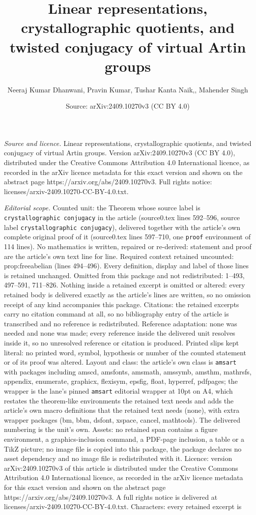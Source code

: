 \documentclass[10pt,a4paper]{amsart}
\title[Linear representations, crystallographic quotients, and twis]{Linear representations, crystallographic quotients, and twisted conjugacy of virtual Artin groups}
\author{Neeraj Kumar Dhanwani, Pravin Kumar, Tushar Kanta Naik,, Mahender Singh}
\date{Source: arXiv:2409.10270v3 (CC BY 4.0)}
\begin{document}
\maketitle

\noindent\emph{Source and licence.} Linear representations, crystallographic quotients, and twisted conjugacy of virtual Artin groups. Version arXiv:2409.10270v3 (CC BY 4.0), distributed under the Creative Commons Attribution 4.0 International licence, as recorded in the arXiv licence metadata for this exact version and shown on the abstract page https://arxiv.org/abs/2409.10270v3. Full rights notice: licenses/arxiv-2409.10270-CC-BY-4.0.txt.\par\smallskip

\noindent\textit{Editorial scope.} Counted unit: the Theorem whose source label is \texttt{crystallographic conjugacy} in the article (source0.tex lines 592--596, source label \texttt{crystallographic conjugacy}), delivered together with the article's own complete original proof of it (source0.tex lines 597--710, one \texttt{proof} environment of 114 lines). No mathematics is written, repaired or re-derived: statement and proof are the article's own text line for line. Required context retained uncounted: prop:freeabelian (lines 494--496). Every definition, display and label of those lines is retained unchanged. Omitted from this package and not redistributed: 1--493, 497--591, 711--826. Nothing inside a retained excerpt is omitted or altered: every retained body is delivered exactly as the article's lines are written, so no omission receipt of any kind accompanies this package. Citations: the retained excerpts carry no citation command at all, so no bibliography entry of the article is transcribed and no reference is redistributed. Reference adaptation: none was needed and none was made; every reference inside the delivered unit resolves inside it, so no unresolved reference or citation is produced. Printed slips kept literal: no printed word, symbol, hypothesis or number of the counted statement or of its proof was altered. Layout and class: the article's own class is \texttt{amsart} with packages including amscd, amsfonts, amsmath, amssymb, amsthm, mathrsfs, appendix, enumerate, graphicx, flexisym, epsfig, float, hyperref, pdfpages; the wrapper is the lane's pinned \texttt{amsart} editorial wrapper at 10pt on A4, which restates the theorem-like environments the retained text needs and adds the article's own macro definitions that the retained text needs (none), with extra wrapper packages (bm, bbm, dsfont, xspace, cancel, mathtools). The delivered numbering is the unit's own. Assets: no retained span contains a figure environment, a graphics-inclusion command, a PDF-page inclusion, a table or a TikZ picture; no image file is copied into this package, the package declares no asset dependency and no image file is redistributed with it. Licence: version arXiv:2409.10270v3 of this article is distributed under the Creative Commons Attribution 4.0 International licence, as recorded in the arXiv licence metadata for this exact version and shown on the abstract page https://arxiv.org/abs/2409.10270v3. A full rights notice is delivered at licenses/arxiv-2409.10270-CC-BY-4.0.txt. Characters: every retained excerpt is 
\end{document}
